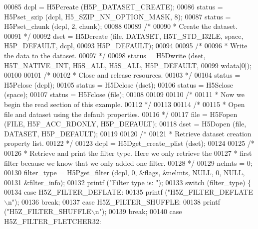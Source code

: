 \begin{DoxyCode}
00085     dcpl = H5Pcreate (H5P\_DATASET\_CREATE);
00086     status = H5Pset\_szip (dcpl, H5\_SZIP\_NN\_OPTION\_MASK, 8);
00087     status = H5Pset\_chunk (dcpl, 2, chunk);
00088 
00089     \textcolor{comment}{/*}
00090 \textcolor{comment}{     * Create the dataset.}
00091 \textcolor{comment}{     */}
00092     dset = H5Dcreate (file, DATASET, H5T\_STD\_I32LE, space, H5P\_DEFAULT, dcpl,
00093                 H5P\_DEFAULT);
00094 
00095     \textcolor{comment}{/*}
00096 \textcolor{comment}{     * Write the data to the dataset.}
00097 \textcolor{comment}{     */}
00098     status = H5Dwrite (dset, H5T\_NATIVE\_INT, H5S\_ALL, H5S\_ALL, H5P\_DEFAULT,
00099                 wdata[0]);
00100 
00101     \textcolor{comment}{/*}
00102 \textcolor{comment}{     * Close and release resources.}
00103 \textcolor{comment}{     */}
00104     status = H5Pclose (dcpl);
00105     status = H5Dclose (dset);
00106     status = H5Sclose (space);
00107     status = H5Fclose (file);
00108 
00109 
00110     \textcolor{comment}{/*}
00111 \textcolor{comment}{     * Now we begin the read section of this example.}
00112 \textcolor{comment}{     */}
00113 
00114     \textcolor{comment}{/*}
00115 \textcolor{comment}{     * Open file and dataset using the default properties.}
00116 \textcolor{comment}{     */}
00117     file = H5Fopen (FILE, H5F\_ACC\_RDONLY, H5P\_DEFAULT);
00118     dset = H5Dopen (file, DATASET, H5P\_DEFAULT);
00119 
00120     \textcolor{comment}{/*}
00121 \textcolor{comment}{     * Retrieve dataset creation property list.}
00122 \textcolor{comment}{     */}
00123     dcpl = H5Dget\_create\_plist (dset);
00124 
00125     \textcolor{comment}{/*}
00126 \textcolor{comment}{     * Retrieve and print the filter type.  Here we only retrieve the}
00127 \textcolor{comment}{     * first filter because we know that we only added one filter.}
00128 \textcolor{comment}{     */}
00129     nelmts = 0;
00130     filter\_type = H5Pget\_filter (dcpl, 0, &flags, &nelmts, NULL, 0, NULL,
00131                 &filter\_info);
00132     printf (\textcolor{stringliteral}{"Filter type is: "});
00133     \textcolor{keywordflow}{switch} (filter\_type) \{
00134         \textcolor{keywordflow}{case} H5Z\_FILTER\_DEFLATE:
00135             printf (\textcolor{stringliteral}{"H5Z\_FILTER\_DEFLATE\(\backslash\)n"});
00136             \textcolor{keywordflow}{break};
00137         \textcolor{keywordflow}{case} H5Z\_FILTER\_SHUFFLE:
00138             printf (\textcolor{stringliteral}{"H5Z\_FILTER\_SHUFFLE\(\backslash\)n"});
00139             \textcolor{keywordflow}{break};
00140         \textcolor{keywordflow}{case} H5Z\_FILTER\_FLETCHER32:

\end{DoxyCode}
